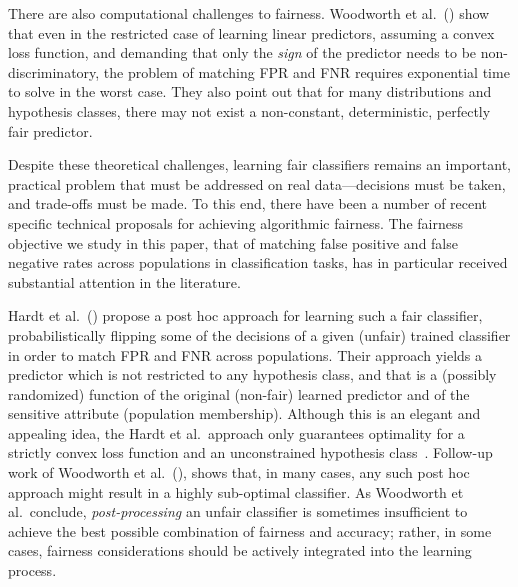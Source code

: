 There are also computational challenges to fairness. Woodworth et al.~(\citeyear{woodworth}) show that even in the restricted case of learning linear predictors, assuming a convex loss function, and demanding that only the {\em sign} of the predictor needs to be non-discriminatory, the problem of matching FPR and FNR requires exponential time to solve in the worst case. They also point out that for many distributions and hypothesis classes, there may not exist a non-constant, deterministic, perfectly fair predictor. 

Despite these theoretical challenges, learning fair classifiers remains an important, practical problem that must be addressed on real data---decisions must be taken, and trade-offs must be made. To this end, there have been a number of recent specific technical proposals for achieving algorithmic fairness. 
The fairness objective we study in this paper, that of matching false positive and false negative rates across populations in classification tasks, has in particular received substantial attention in the literature. %


Hardt et al.~(\citeyear{hardt}) propose a post hoc approach for learning such a fair classifier, probabilistically flipping some of the decisions of a given (unfair) trained classifier in order to match FPR and FNR across populations. Their approach yields a predictor which is not restricted to any hypothesis class, and that is a (possibly randomized) function of the original (non-fair) learned predictor and of the sensitive attribute (population membership). Although this is an elegant and appealing idea, the Hardt et al.~approach only guarantees optimality for a strictly convex loss function and an unconstrained hypothesis class~\cite{woodworth}. Follow-up work of Woodworth et al.~(\citeyear{woodworth}), shows that, in many cases, any such post hoc approach might result in a highly sub-optimal classifier. As Woodworth et al.~conclude, {\em post-processing} an unfair classifier is sometimes insufficient to achieve the best possible combination of fairness and accuracy; rather, in some cases, fairness considerations should be actively integrated into the learning process. %

